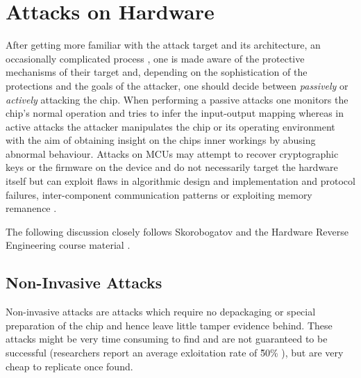 \section{Attacks on Hardware}
\label{sec:curr_attacks}
After getting more familiar with the attack target and its architecture, an occasionally complicated process \citep{sergei:thesis} \citep{hwre},  one is made aware of the protective mechanisms of their target and, depending on the sophistication of the protections and the goals of the attacker, one should decide between \emph{passively} or \emph{actively} attacking the chip. When performing a passive attacks one monitors the chip's normal operation and tries to infer the input-output mapping whereas in active attacks the attacker manipulates the chip or its operating environment with the aim of obtaining insight on the chips inner workings by abusing abnormal behaviour. Attacks on MCUs may attempt to recover cryptographic keys or the firmware on the device and do not necessarily target the hardware itself but can exploit flaws in algorithmic design and implementation and protocol failures, inter-component communication patterns \citep{anderson:cautionary_note} \citep{kocher:DPA} or exploiting memory remanence \citep{sergei:thesis} \citep{gutman:memory_remanence}.

The following discussion closely follows Skorobogatov \citep{sergei:thesis} and the Hardware Reverse Engineering course material \citep{hwre}.

	\subsection{Non-Invasive Attacks}
	Non-invasive attacks are attacks which require no depackaging or special preparation of the chip and hence leave little tamper evidence behind. These attacks might be very time consuming to find and are not guaranteed to be successful (researchers report an average exloitation rate of \~50\% \citep{sergei:thesis} \citep{glitches_paper}), but are very cheap to replicate once found.
	
